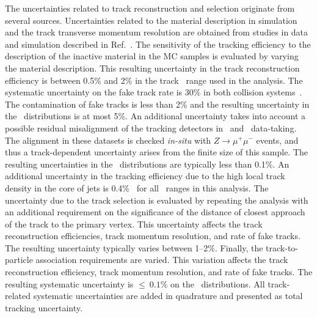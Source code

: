 The uncertainties related to track reconstruction and selection originate from several sources.
Uncertainties related to the material description in simulation and the track transverse 
momentum resolution are obtained from studies in data and simulation described in Ref.~\cite{ATL-PHYS-PUB-2015-051}.
The sensitivity of the tracking efficiency to the description of the 
inactive material in the MC samples is evaluated by varying the material description.
This resulting uncertainty in the track reconstruction efficiency is between
0.5\% and 2\% in the track \pT\ range used in the analysis. 
The systematic uncertainty on the fake track rate is 30\% in both collision systems~\cite{ATL-PHYS-PUB-2015-051}.  The contamination of fake tracks is less than 2\% and the resulting uncertainty in the \Dptr\ distributions is at most 5\%.
An additional uncertainty takes into account a possible residual misalignment of the tracking detectors
in \pp\ and \PbPb\ data-taking. The alignment in these datasets is checked \textit{in-situ} with $Z\rightarrow \mu^{+}\mu^{-}$ events, and thus a track-\pT\-dependent uncertainty arises from the finite size of this sample. The resulting uncertainties in
the \Dptr\ distributions are typically less than 0.1\%. An additional  uncertainty in the tracking efficiency due to the high local track density in the core of jets is 0.4\%~\cite{ATL-PHYS-PUB-2016-007} for all \ptjet\ ranges in this analysis. The uncertainty due to the track selection is evaluated by repeating the analysis with an additional requirement on the significance of the distance of closest approach of the track to the primary vertex. This uncertainty affects 
the track reconstruction efficiencies, track momentum resolution, and rate of fake tracks. The resulting uncertainty typically varies between 1--2\%.
Finally, the track-to-particle association requirements are varied. This variation affects the track reconstruction efficiency, track momentum resolution, and rate of fake tracks. The resulting systematic uncertainty is $\leq~0.1 \%$ on the \Dptr\ distributions. All track-related systematic uncertainties are added in quadrature and presented as total tracking uncertainty. 

